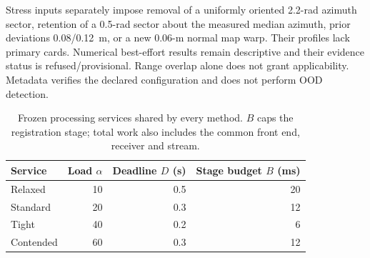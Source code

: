 Stress inputs separately impose removal of a uniformly oriented 2.2-rad azimuth sector, retention of a 0.5-rad sector about the measured median azimuth, prior deviations 0.08/0.12~m, or a new 0.06-m normal map warp. Their profiles lack primary cards. Numerical best-effort results remain descriptive and their evidence status is refused/provisional. Range overlap alone does not grant applicability. Metadata verifies the declared configuration and does not perform OOD detection.

\begin{table}[t]\centering\small
\caption{Frozen processing services shared by every method. $B$ caps the registration stage; total work also includes the common front end, receiver and stream.}\label{tab:services}
\begin{tabular}{@{}lrrr@{}}\toprule
Service & Load $\alpha$ & Deadline $D$ (s)& Stage budget $B$ (ms)\\\midrule
Relaxed &10&0.5&20\\
Standard &20&0.3&12\\
Tight &40&0.2&6\\
Contended &60&0.3&12\\\bottomrule
\end{tabular}
\end{table}


